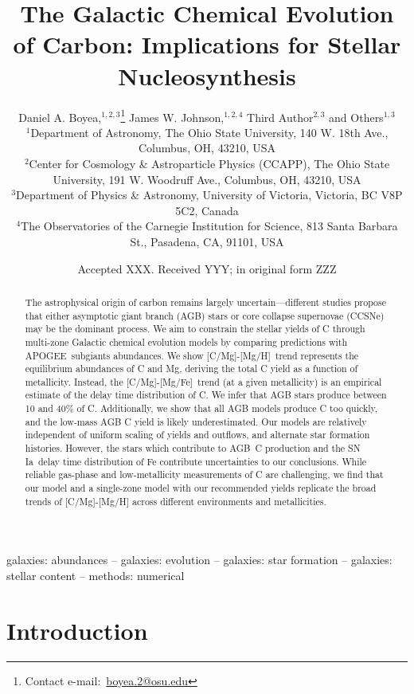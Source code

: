 \documentclass[fleqn,
usenatbib]{mnras}
\title[The Origin and Galactic Evolution of Carbon]{The Galactic Chemical Evolution of Carbon: Implications for Stellar Nucleosynthesis }
\author[D. A. Boyea et. al.]{%
Daniel A. Boyea,$^{1, 2, 3}$\thanks{%
Contact e-mail:~\href{mailto:boyea.2@osu.edu}{boyea.2@osu.edu}}
James W. Johnson,$^{1, 2, 4}$
Third Author$^{2,3}$
and Others$^{1,3}$
\\
$^{1}$Department of Astronomy, The Ohio State University, 140 W. 18th Ave., Columbus, OH, 43210, USA
\\
$^{2}$Center for Cosmology \& Astroparticle Physics (CCAPP), The Ohio State University, 191 W. Woodruff Ave., Columbus, OH, 43210, USA
\\
$^{3}$Department of Physics \& Astronomy, University of Victoria, Victoria, BC V8P 5C2, Canada
\\
$^{4}$The Observatories of the Carnegie Institution for Science, 813 Santa Barbara St., Pasadena, CA, 91101, USA
}
\date{Accepted XXX. Received YYY; in original form ZZZ}
\newcommand{\agb}{AGB}
\newcommand{\apogee}{APOGEE}
\newcommand{\ia}{SN Ia}
\newcommand{\caah}{[C/Mg]-[Mg/H]}
\newcommand{\caafe}{[C/Mg]-[Mg/Fe]}
\begin{document}
\label{firstpage}
\pagerange{\pageref{firstpage}--\pageref{lastpage}}
\maketitle



\begin{abstract}
The astrophysical origin of carbon remains largely uncertain---different studies propose that either asymptotic giant branch (AGB) stars or core collapse supernovae (CCSNe) may be the dominant process.
% 
We aim to constrain the stellar yields of C through multi-zone Galactic chemical evolution models by comparing predictions with \apogee\ subgiants abundances.
% 
We show \caah\ trend represents the equilibrium abundances of C and Mg, deriving the total C yield as a function of metallicity. 
Instead, the \caafe\ trend (at a given metallicity) is an empirical estimate of the delay time distribution of C.
We infer that AGB stars produce between 10 and 40\% of C. Additionally, we show that all AGB models produce C too quickly, and the low-mass AGB C yield is likely underestimated. 
Our models are relatively independent of uniform scaling of yields and outflows, and alternate star formation histories. 
However, the stars which contribute to \agb\ C production and the \ia\ delay time distribution of Fe contribute uncertainties to our conclusions. 
While reliable gas-phase and low-metallicity measurements of C are challenging, we find that our model and a single-zone model with our recommended yields replicate the broad trends of \caah{} across different environments and metallicities. 

\end{abstract}

\begin{keywords}
galaxies: abundances -- galaxies: evolution -- galaxies: star formation -- galaxies: stellar content -- methods: numerical
\end{keywords}





\section{Introduction}
\end{document}
